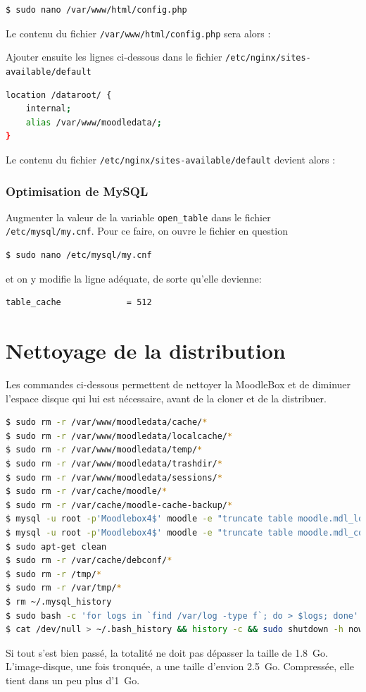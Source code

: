\documentclass[11pt]{article}
\begin{document}
\begin{lstlisting}[language=bash]
$ sudo nano /var/www/html/config.php
\end{lstlisting}

Le contenu du fichier \lstinline{/var/www/html/config.php} sera alors : 


Ajouter ensuite les lignes ci-dessous dans le fichier \lstinline{/etc/nginx/sites-available/default}

\begin{lstlisting}[language=bash]
location /dataroot/ {
    internal;
    alias /var/www/moodledata/;
}
\end{lstlisting}

Le contenu du fichier \lstinline{/etc/nginx/sites-available/default} devient alors : 


\subsubsection{Optimisation de MySQL}

Augmenter la valeur de la variable \lstinline{open_table} dans le fichier \lstinline{/etc/mysql/my.cnf}. Pour ce faire, on ouvre le fichier en question
\begin{lstlisting}[language=bash]
$ sudo nano /etc/mysql/my.cnf
\end{lstlisting}

et on y modifie la ligne adéquate, de sorte qu'elle devienne:
\begin{lstlisting}[language=bash]
table_cache             = 512
\end{lstlisting}

\section{Nettoyage de la distribution}

Les commandes ci-dessous permettent de nettoyer la MoodleBox et de diminuer l'espace disque qui lui est nécessaire, avant de la cloner et de la distribuer.

\begin{lstlisting}[language=bash]
$ sudo rm -r /var/www/moodledata/cache/*
$ sudo rm -r /var/www/moodledata/localcache/*
$ sudo rm -r /var/www/moodledata/temp/*
$ sudo rm -r /var/www/moodledata/trashdir/*
$ sudo rm -r /var/www/moodledata/sessions/*
$ sudo rm -r /var/cache/moodle/*
$ sudo rm -r /var/cache/moodle-cache-backup/*
$ mysql -u root -p'Moodlebox4$' moodle -e "truncate table moodle.mdl_logstore_standard_log"
$ mysql -u root -p'Moodlebox4$' moodle -e "truncate table moodle.mdl_config_log"
$ sudo apt-get clean
$ sudo rm -r /var/cache/debconf/*
$ sudo rm -r /tmp/*
$ sudo rm -r /var/tmp/*
$ rm ~/.mysql_history
$ sudo bash -c 'for logs in `find /var/log -type f`; do > $logs; done'
$ cat /dev/null > ~/.bash_history && history -c && sudo shutdown -h now
\end{lstlisting}

Si tout s'est bien passé, la totalité ne doit pas dépasser la taille de 1.8~Go. L'image-disque, une fois tronquée, a une taille d'envion 2.5~Go. Compressée, elle tient dans un peu plus d'1~Go. 
\end{document}
